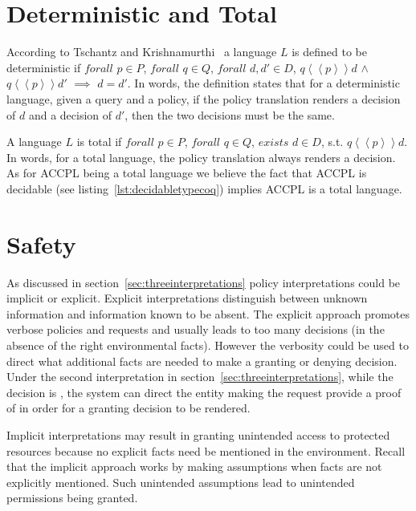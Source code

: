 \section{Deterministic and Total}

According to Tschantz and Krishnamurthi~\cite{Tschantz} a language $L$ is defined to be deterministic if $forall$ $p \in P$, $forall$ $q \in Q$, $forall$ $d, d' \in D$, $q \left\langle\left\langle p  \right\rangle\right\rangle d$ $\land$ $q \left\langle\left\langle p  \right\rangle\right\rangle d'$ $\implies$ $d = d'$. In words, the definition states that for a deterministic language, given a query and a policy, if the policy translation renders a decision of $d$ and a decision of $d'$, then the two decisions must be the same.

A language $L$ is total if $forall$ $p \in P$, $forall$ $q \in Q$, $exists$ $d \in D$, s.t. $q \left\langle\left\langle p  \right\rangle\right\rangle d$. In words, for a total language, the policy translation always renders a decision. As for \ac{ACCPL} being a total language we believe the fact that \ac{ACCPL} is decidable (see listing~\ref{lst:decidabletypecoq}) implies \ac{ACCPL} is a total language.


\section{Safety}

As discussed in section~\ref{sec:threeinterpretations} policy interpretations could be implicit or explicit. Explicit interpretations distinguish between unknown information and information known to be absent. The explicit approach promotes verbose policies and requests and usually leads to too many  decisions (in the absence of the right environmental facts). However the verbosity could be used to direct what additional facts are needed to make a granting or denying decision. Under the second interpretation in section~\ref{sec:threeinterpretations}, while the decision is , the system can direct the entity making the request provide a proof of  in order for a granting decision to be rendered. 

Implicit interpretations may result in granting unintended access to protected resources because no explicit facts need be mentioned in the environment. Recall that the implicit approach works by making assumptions when facts are not explicitly mentioned. Such unintended assumptions lead to unintended permissions being granted.

